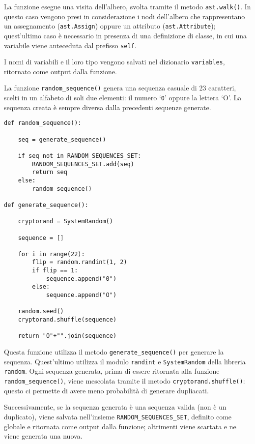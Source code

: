 \documentclass[a4paper,oneside,openright,titlepage,10pt,footinclude,headinclude]{scrbook}
\begin{document}
La funzione esegue una visita dell'albero, svolta tramite il metodo \texttt{ast.walk()}. In questo caso vengono presi in considerazione i nodi dell'albero che rappresentano un assegnamento (\texttt{ast.Assign}) oppure un attributo (\texttt{ast.Attribute}); quest'ultimo caso è necessario in presenza di una definizione di classe, in cui una variabile viene anteceduta dal prefisso \texttt{self}.

I nomi di variabili e il loro tipo vengono salvati nel dizionario \texttt{variables}, ritornato come output dalla funzione.\bigskip

La funzione \texttt{random\_sequence()} genera una sequenza casuale di 23 caratteri, scelti in un alfabeto di soli due elementi: il numero `\texttt{0}' oppure la lettera `O'. La sequenza creata è sempre diversa dalla precedenti sequenze generate.
\begin{graybox}[innerleftmargin=2,]
\begin{lstlisting}
def random_sequence():

    seq = generate_sequence()

    if seq not in RANDOM_SEQUENCES_SET:
        RANDOM_SEQUENCES_SET.add(seq)
        return seq
    else:
        random_sequence()

def generate_sequence():

    cryptorand = SystemRandom()

    sequence = []

    for i in range(22):
        flip = random.randint(1, 2)
        if flip == 1:
            sequence.append("0")
        else:
            sequence.append("O")

    random.seed()
    cryptorand.shuffle(sequence)

    return "O"+"".join(sequence)
\end{lstlisting}
\end{graybox}

Questa funzione utilizza il metodo \texttt{generate\_sequence()} per generare la sequenza. Quest'ultimo utilizza il modulo \texttt{randint} e \texttt{SystemRandom} della libreria \texttt{random}.  Ogni sequenza generata, prima di essere ritornata alla funzione \texttt{random\_sequence()}, viene mescolata tramite il metodo \texttt{cryptorand.shuffle()}: questo ci permette di avere meno probabilità di generare dupliacati.

Successivamente, se la sequenza generata è una sequenza valida (non è un duplicato), viene salvata nell'insieme \texttt{RANDOM\_SEQUENCES\_SET}, definito come globale e ritornata come output dalla funzione; altrimenti viene scartata e ne viene generata una nuova.\bigskip
\end{document}
